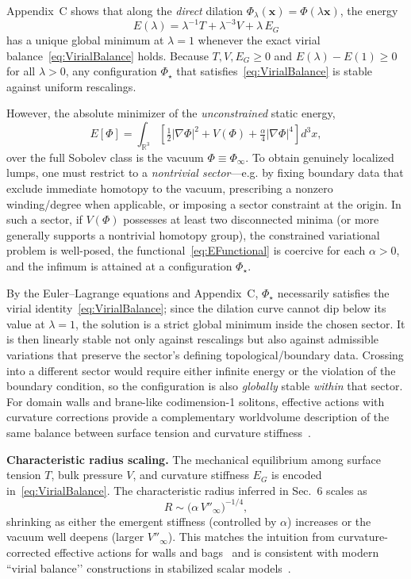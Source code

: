 \documentclass{article}
\begin{document}
Appendix~C shows that along the \emph{direct} dilation $\Phi_\lambda(\mathbf{x})=\Phi(\lambda\mathbf{x})$, the energy
\begin{equation}
E(\lambda)=\lambda^{-1}T+\lambda^{-3}V+\lambda\,E_G
\end{equation}
has a unique global minimum at $\lambda=1$ whenever the exact virial balance~\eqref{eq:VirialBalance} holds. Because $T,V,E_G\ge0$ and $E(\lambda)-E(1)\ge0$ for all $\lambda>0$, any configuration $\Phi_\star$ that satisfies~\eqref{eq:VirialBalance} is stable against uniform rescalings.

However, the absolute minimizer of the \emph{unconstrained} static energy,
\begin{equation}
E[\Phi]=\!\int_{\mathbb{R}^3}\!\left[\tfrac12|\nabla\Phi|^2 + V(\Phi) + \tfrac{\alpha}{4}|\nabla\Phi|^4\right] d^3x,
\label{eq:EFunctional}
\end{equation}
over the full Sobolev class is the vacuum $\Phi\equiv\Phi_\infty$. To obtain genuinely localized lumps, one must restrict to a \emph{nontrivial sector}—e.g. by fixing boundary data that exclude immediate homotopy to the vacuum, prescribing a nonzero winding/degree when applicable, or imposing a sector constraint at the origin. In such a sector, if $V(\Phi)$ possesses at least two disconnected minima (or more generally supports a nontrivial homotopy group), the constrained variational problem is well-posed, the functional~\eqref{eq:EFunctional} is coercive for each $\alpha>0$, and the infimum is attained at a configuration $\Phi_\star$.

By the Euler–Lagrange equations and Appendix~C, $\Phi_\star$ necessarily satisfies the virial identity~\eqref{eq:VirialBalance}; since the dilation curve cannot dip below its value at $\lambda=1$, the solution is a strict global minimum inside the chosen sector. It is then linearly stable not only against rescalings but also against admissible variations that preserve the sector’s defining topological/boundary data. Crossing into a different sector would require either infinite energy or the violation of the boundary condition, so the configuration is also \emph{globally} stable \emph{within} that sector. For domain walls and brane-like codimension-1 solitons, effective actions with curvature corrections provide a complementary worldvolume description of the same balance between surface tension and curvature stiffness~\cite{BlancoPillado2025_DomainWalls}.

\textbf{Characteristic radius scaling.}
The mechanical equilibrium among surface tension $T$, bulk pressure $V$, and curvature stiffness $E_G$ is encoded in~\eqref{eq:VirialBalance}. The characteristic radius inferred in Sec.~6 scales as
\begin{equation}
R \sim \big(\alpha\,V''_\infty\big)^{-1/4},
\label{eq:RadiusScaling}
\end{equation}
shrinking as either the emergent stiffness (controlled by $\alpha$) increases or the vacuum well deepens (larger $V''_\infty$). This matches the intuition from curvature-corrected effective actions for walls and bags~\cite{BlancoPillado2025_DomainWalls} and is consistent with modern “virial balance’’ constructions in stabilized scalar models~\cite{Ferreira2025_GaugedQballs}.
\end{document}

